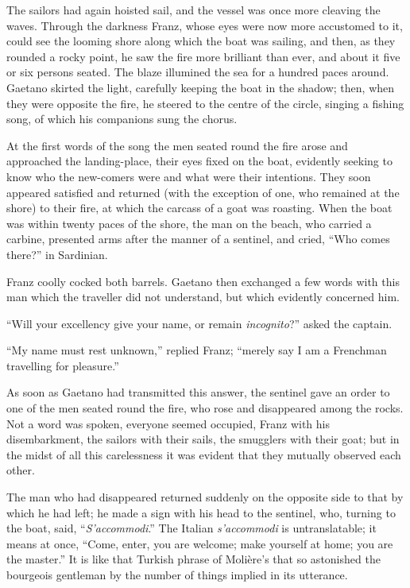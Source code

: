 The sailors had again hoisted sail, and the vessel was once more
cleaving the waves. Through the darkness Franz, whose eyes were now
more accustomed to it, could see the looming shore along which the boat
was sailing, and then, as they rounded a rocky point, he saw the fire
more brilliant than ever, and about it five or six persons seated. The
blaze illumined the sea for a hundred paces around. Gaetano skirted the
light, carefully keeping the boat in the shadow; then, when they were
opposite the fire, he steered to the centre of the circle, singing a
fishing song, of which his companions sung the chorus.

At the first words of the song the men seated round the fire arose and
approached the landing-place, their eyes fixed on the boat, evidently
seeking to know who the new-comers were and what were their intentions.
They soon appeared satisfied and returned (with the exception of one,
who remained at the shore) to their fire, at which the carcass of a
goat was roasting. When the boat was within twenty paces of the shore,
the man on the beach, who carried a carbine, presented arms after the
manner of a sentinel, and cried, “Who comes there?” in Sardinian.

Franz coolly cocked both barrels. Gaetano then exchanged a few words
with this man which the traveller did not understand, but which
evidently concerned him.

“Will your excellency give your name, or remain \textit{incognito}?” asked the
captain.

“My name must rest unknown,” replied Franz; “merely say I am a
Frenchman travelling for pleasure.”

As soon as Gaetano had transmitted this answer, the sentinel gave an
order to one of the men seated round the fire, who rose and disappeared
among the rocks. Not a word was spoken, everyone seemed occupied, Franz
with his disembarkment, the sailors with their sails, the smugglers
with their goat; but in the midst of all this carelessness it was
evident that they mutually observed each other.

The man who had disappeared returned suddenly on the opposite side to
that by which he had left; he made a sign with his head to the
sentinel, who, turning to the boat, said, “\textit{S’accommodi}.” The Italian
\textit{s’accommodi} is untranslatable; it means at once, “Come, enter, you
are welcome; make yourself at home; you are the master.” It is like
that Turkish phrase of Molière’s that so astonished the bourgeois
gentleman by the number of things implied in its utterance.

